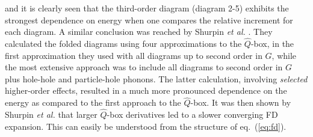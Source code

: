 and it is clearly seen that the third-order
diagram (diagram 2-5)  exhibits 
the strongest dependence on energy when one
compares the relative increment for each diagram.
A similar conclusion was reached by Shurpin
{\em et al.} \cite{skd83}. They calculated the folded diagrams using
four approximations to the $\hat{Q}$-box, in the first 
approximation they used with 
all diagrams up to second order in $G$, while the most extensive
approach was to include 
all diagrams to second order in $G$ plus hole-hole and
particle-hole phonons. The latter calculation, involving
{\em selected} higher-order effects, resulted in a much more
pronounced dependence on the energy as compared to the
first approach to the $\hat{Q}$-box.
It was then shown by Shurpin {\em et al.} \cite{skd83} that larger
$\hat{Q}$-box derivatives led to a slower converging FD
expansion. This can easily be understood from the structure of
eq.\ (\ref{eq:fd}).


